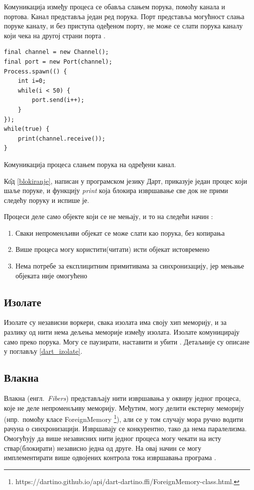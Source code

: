 \documentclass[12pt,oneside]{memoir}
\begin{document}
Комуникација између процеса се обавља слањем порука, помоћу канала и портова. Канал представља један ред порука. Порт представља могућност слања поруке каналу, и без приступа одеђеном порту, не може се слати порука каналу који чека на другој страни порта \cite{Dartino}.

\begin{listing}
\begin{verbatim}
final channel = new Channel();
final port = new Port(channel);
Process.spawn(() {
	int i=0;
	while(i < 50) {
		port.send(i++);
	}
});
while(true) {
	print(channel.receive());
}
\end{verbatim}
\caption{Комуникација процеса слањем порука на одређени канал.}
\label{blokiranje}
\end{listing}

К\^{о}д \ref{blokiranje}, написан у програмском језику Дарт, приказује један процес који шаље поруке, и функцију \textit{print} која блокира извршавање све док не прими следећу поруку и испише је.

Процеси деле само објекте који се не мењају, и то на следећи начин \cite{Dartino}:
\begin{enumerate}
\item Сваки непроменљиви објекат се може слати као порука, без копирања
\item Више процеса могу користити(читати) исти објекат истовремено
\item Нема потребе за експлицитним примитивама за синхронизацију, јер мењање објеката није омогућено
\end{enumerate}

\subsection{Изолате}
\label{dartino_isolate}

Изолате су независни воркери, свака изолата има своју хип меморију, и за разлику од нити нема дељења меморије између изолата. Изолате комуницирају само преко порука. Могу се паузирати, наставити и убити \cite{procesi_i_izolate}. Детаљније су описане у поглављу \ref{dart_izolate}.

\subsection{Влакна}
\label{vlakna}

Влакна (енгл.~\textit{Fibers}) представљају нити извршавања у оквиру једног процеса, које не деле непроменљиву меморију. Међутим, могу делити екстерну меморију (нпр.~помоћу класе ForeignMemory \footnote{https://dartino.github.io/api/dart-dartino.ffi/ForeignMemory-class.html.}), али се у том случају мора ручно водити рачуна о синхронизацији. Извршавају се конкурентно, тако да нема паралелизма. Омогућују да више независних нити једног процеса могу чекати на исту ствар(блокирати) независно једна од друге. На овај начин се могу имплементирати више одвојених контрола тока извршавања програма \cite{korutine_i_vlakna}.
\end{document}
